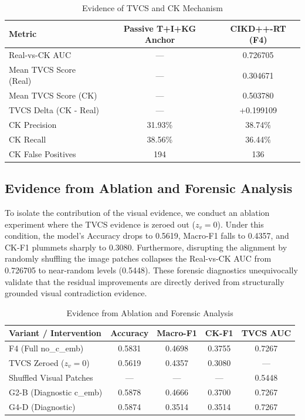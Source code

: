 \begin{table}[!t]
\centering
\caption{Evidence of TVCS and CK Mechanism}
\begin{tabularx}{\textwidth}{|X|c|c|}
\hline
\textbf{Metric} & \textbf{Passive T+I+KG Anchor} & \textbf{CIKD++-RT (F4)} \\
\hline
Real-vs-CK AUC & — & 0.726705 \\
\hline
Mean TVCS Score (Real) & — & 0.304671 \\
\hline
Mean TVCS Score (CK) & — & 0.503780 \\
\hline
TVCS Delta (CK - Real) & — & +0.199109 \\
\hline
CK Precision & 31.93\% & 38.74\% \\
\hline
CK Recall & 38.56\% & 36.44\% \\
\hline
CK False Positives & 194 & 136 \\
\hline
\end{tabularx}
\end{table}

\subsection{Evidence from Ablation and Forensic Analysis}
To isolate the contribution of the visual evidence, we conduct an ablation experiment where the TVCS evidence is zeroed out ($z_v = 0$). Under this condition, the model's Accuracy drops to 0.5619, Macro-F1 falls to 0.4357, and CK-F1 plummets sharply to 0.3080. Furthermore, disrupting the alignment by randomly shuffling the image patches collapses the Real-vs-CK AUC from 0.726705 to near-random levels (0.5448). These forensic diagnostics unequivocally validate that the residual improvements are directly derived from structurally grounded visual contradiction evidence.

\begin{table}[!t]
\centering
\caption{Evidence from Ablation and Forensic Analysis}
\begin{tabularx}{\textwidth}{|X|c|c|c|c|}
\hline
\textbf{Variant / Intervention} & \textbf{Accuracy} & \textbf{Macro-F1} & \textbf{CK-F1} & \textbf{TVCS AUC} \\
\hline
F4 (Full no\_c\_emb) & 0.5831 & 0.4698 & 0.3755 & 0.7267 \\
\hline
TVCS Zeroed ($z_v=0$) & 0.5619 & 0.4357 & 0.3080 & — \\
\hline
Shuffled Visual Patches & — & — & — & 0.5448 \\
\hline
G2-B (Diagnostic c\_emb) & 0.5878 & 0.4666 & 0.3700 & 0.7267 \\
\hline
G4-D (Diagnostic) & 0.5874 & 0.3514 & 0.3514 & 0.7267 \\
\hline
\end{tabularx}
\end{table}


